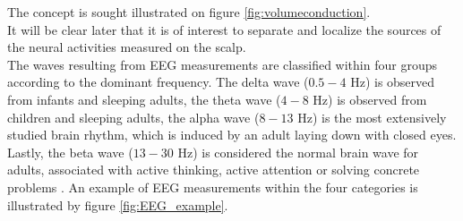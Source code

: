 The concept is sought illustrated on figure \ref{fig:volumeconduction}. 
\\
It will be clear later that it is of interest to separate and localize the sources of the neural activities measured on the scalp.  
\\ 
The waves resulting from EEG measurements are classified within four groups according to the dominant frequency. 
The delta wave ($0.5-4$ Hz) is observed from infants and sleeping adults, the theta wave ($4-8$ Hz) is observed from children and sleeping adults, the alpha wave ($8-13$ Hz) is the most extensively studied brain rhythm, which is induced by an adult laying down with closed eyes. 
Lastly, the beta wave ($13-30$ Hz) is considered the normal brain wave for adults, associated with active thinking, active attention or solving concrete problems \cite[p. 11]{EEGsignalprocessing}. 
An example of EEG measurements within the four categories is illustrated by figure \ref{fig:EEG_example}.        
